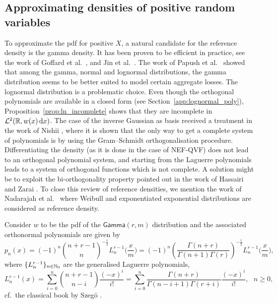 \subsection{Approximating densities of positive random variables} \label{ssec:PolynomialApproxPositive}

To approximate the pdf for positive $X$, a natural candidate for the reference density is the gamma density. It has been proven to be efficient in practice, see the work of Goffard et al.\ \cite{GoLoPo15,GoLoPo16}, and Jin et al.\ \cite{JiPrRe16}. The work of Papush et al.\ \cite{PaPaPo01} showed that among the gamma, normal and lognormal distributions, the gamma distribution seems to be better suited to model certain aggregate losses. The lognormal distribution is a problematic choice. Even though the orthogonal polynomials are available in a closed form (see Section~\ref{app:lognormal_poly}), Proposition~\ref{prop:ln_incomplete} shows that they are incomplete in $\mathcal{L}^2(\mathbb{R}, w(x) \mathop{}\!\mathrm{d} x)$. The case of the inverse Gaussian as basis received a treatment in the work of Nishii \cite{Ni96}, where it is shown that the only way to get a complete system of polynomials is by using the Gram--Schmidt orthogonalisation procedure. Differentiating the density (as it is done in the case of NEF-QVF) does not lead to an orthogonal polynomial system, and starting from the Laguerre polynomials leads to a system of orthogonal functions which is not complete. A solution might be to exploit the bi-orthogonality property pointed out in the work of Hassairi and Zarai \cite{HaZa04}. To close this review of reference densities, we mention the work of Nadarajah et al.\ \cite{NaChJi16} where Weibull and exponentiated exponential distributions are considered as reference density.

Consider $w$ to be the pdf of the $\mathsf{Gamma}(r,m)$ distribution
and the associated orthonormal polynomials are given by
\begin{equation*}\label{eq:GeneralizedLaguerrePolynomials}
p_{n}(x)
=(-1)^{n} \binom{n + r - 1}{n}^{-\frac12} L_{n}^{r-1}\big(\frac{x}{m}\big)
=(-1)^{n} \left( \frac{\Gamma(n+r)}{\Gamma(n+1)\Gamma(r)} \right)^{-\frac12} L_{n}^{r-1}\big(\frac{x}{m}\big),
\end{equation*}
where $\{L_{n}^{r-1}\}_{n\in\mathbb{N}_0}$ are the generalised Laguerre polynomials,
\begin{equation*}\label{eq:GeneralizedLaguerrePolynomialsExpression}
L_{n}^{r-1}(x)
=\sum_{i=0}^{n} \binom{n + r - 1}{n - i} \frac{(-x)^i}{i!}
=\sum_{i=0}^{n} \frac{\Gamma(n+r)}{\Gamma(n-i+1)\Gamma(r+i)}\frac{(-x)^i}{i!}, \text{ }n\geq 0,
\end{equation*}
cf.\ the classical book by Szeg{\"o} \cite{Szegoe1939}. %

